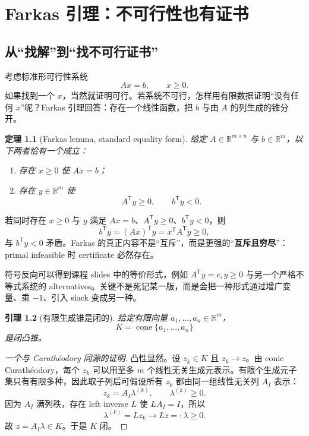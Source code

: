 \documentclass[11pt,a4paper,openany]{ctexrep}
\newtheorem{theorem}{定理}[chapter]
\newtheorem{lemma}[theorem]{引理}
\theoremstyle{definition}
\newcommand{\R}{\mathbb{R}}
\newcommand{\cone}{\operatorname{cone}}
\newcommand{\transpose}{\mathsf{T}}
\begin{document}
\chapter{Farkas 引理：不可行性也有证书}

\section{从“找解”到“找不可行证书”}
考虑标准形可行性系统
\begin{equation}
Ax=b,
\qquad x\ge0.
\label{eq:farkas-primal}
\end{equation}
如果找到一个 $x$，当然就证明可行。若系统不可行，怎样用有限数据证明“没有任何 $x$”呢？Farkas 引理回答：存在一个线性函数，把 $b$ 与由 $A$ 的列生成的锥分开。

\begin{theorem}[Farkas lemma, standard equality form]
给定 $A\in\R^{m\times n}$ 与 $b\in\R^m$，以下两者恰有一个成立：
\begin{enumerate}[label=(\alph*)]
  \item 存在 $x\ge0$ 使 $Ax=b$；
  \item 存在 $y\in\R^m$ 使
  \[
  A^\transpose y\ge0,
  \qquad b^\transpose y<0.
  \]
\end{enumerate}
\end{theorem}

\begin{proofmap}[为什么两套系统不可能同时有解？]
若同时存在 $x\ge0$ 与 $y$ 满足 $Ax=b$、$A^\transpose y\ge0$、$b^\transpose y<0$，则
\[
b^\transpose y=(Ax)^\transpose y=x^\transpose A^\transpose y\ge0,
\]
与 $b^\transpose y<0$ 矛盾。Farkas 的真正内容不是“互斥”，而是更强的“\textbf{互斥且穷尽}”：primal infeasible 时 certificate 必然存在。
\end{proofmap}

符号反向可以得到课程 slides 中的等价形式，例如 $A^\transpose y=c,y\ge0$ 与另一个严格不等式系统的 alternatives。关键不是死记某一版，而是会把一种形式通过增广变量、乘 $-1$、引入 slack 变成另一种。


\begin{lemma}[有限生成锥是闭的]
给定有限向量 $a_1,\ldots,a_n\in\R^m$，
\[
K=\cone\{a_1,\ldots,a_n\}
\]
是闭凸锥。
\end{lemma}
\begin{proof}[一个与 Carath\'eodory 同源的证明]
凸性显然。设 $z_k\in K$ 且 $z_k\to z$。由 conic Carath\'eodory，每个 $z_k$ 可以用至多 $m$ 个线性无关生成元表示。有限个生成元子集只有有限多种，因此取子列后可假设所有 $z_k$ 都由同一组线性无关列 $A_I$ 表示：
\[
z_k=A_I\lambda^{(k)},\qquad \lambda^{(k)}\ge0.
\]
因为 $A_I$ 满列秩，存在 left inverse $L$ 使 $LA_I=I$，所以
\[
\lambda^{(k)}=Lz_k\to Lz=: \lambda\ge0.
\]
故 $z=A_I\lambda\in K$。于是 $K$ 闭。
\end{proof}
\end{document}
